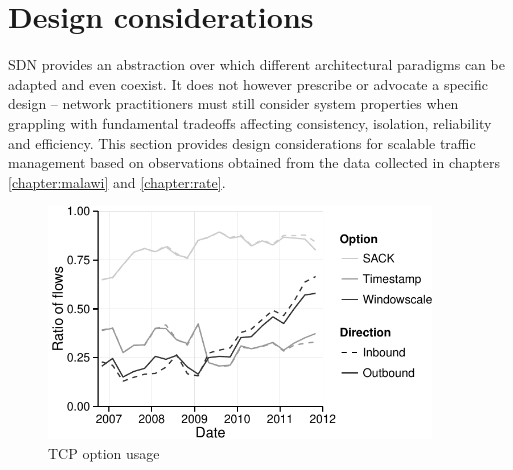 \section{Design considerations}
\label{section:design}


\ac{SDN} provides an abstraction over which different architectural paradigms can be adapted and even coexist.
It does not however prescribe or advocate a specific design -- network practitioners must still consider system properties when grappling with fundamental tradeoffs affecting consistency, isolation, reliability and efficiency.
This section provides design considerations for scalable traffic management based on observations obtained from the data collected in chapters \ref{chapter:malawi} and \ref{chapter:rate}.

\begin{figure}[t]
    \centering
    \includegraphics[width=4.0in]{figures/inflex/options}
    \caption{\acs{TCP} option usage \label{fig:wscale}}
    \hfill
\end{figure}

